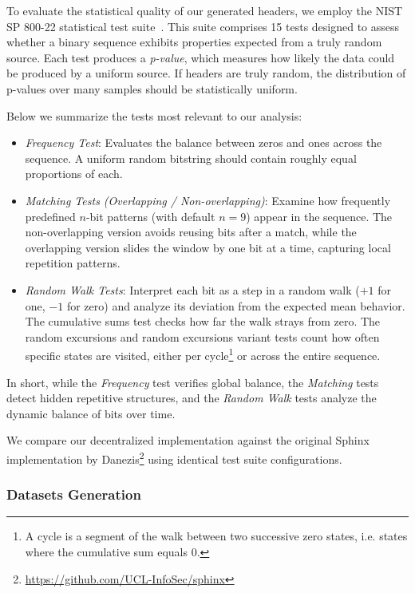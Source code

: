 To evaluate the statistical quality of our generated headers, we employ the NIST SP 800-22 statistical test suite~\cite{NIST-SP80022}.
This suite comprises 15 tests designed to assess whether a binary sequence exhibits properties expected from a truly random source.
Each test produces a \emph{p-value}, which measures how likely the data could be produced by a uniform source. 
If headers are truly random, the distribution of p-values over many samples should be statistically uniform.

Below we summarize the tests most relevant to our analysis:
\begin{itemize}
    \item \emph{Frequency Test}:
    Evaluates the balance between zeros and ones across the sequence. 
    A uniform random bitstring should contain roughly equal proportions of each.

    \item \emph{Matching Tests (Overlapping / Non-overlapping)}: 
    Examine how frequently predefined $n$-bit patterns (with default $n=9$) appear in the sequence.
    The non-overlapping version avoids reusing bits after a match, while the overlapping version slides the window by one bit at a time, capturing local repetition patterns.

    \item \emph{Random Walk Tests}:
    Interpret each bit as a step in a random walk ($+1$ for one, $-1$ for zero) and analyze its deviation from the expected mean behavior.
    The {cumulative sums} test checks how far the walk strays from zero.
    The {random excursions} and {random excursions variant} tests count how often specific states are visited, either per cycle\footnote{A cycle is a segment of the walk between two successive zero states, i.e. states where the cumulative sum equals $0$.} or across the entire sequence.
\end{itemize}
In short, while the \emph{Frequency} test verifies global balance, the \emph{Matching} tests detect hidden repetitive structures, and the \emph{Random Walk} tests analyze the dynamic balance of bits over time.
\newline

We compare our decentralized implementation against the original Sphinx implementation by Danezis\footnote{\href{https://github.com/UCL-InfoSec/sphinx}{https://github.com/UCL-InfoSec/sphinx}} using identical test suite configurations.


\subsubsection{Datasets Generation}

